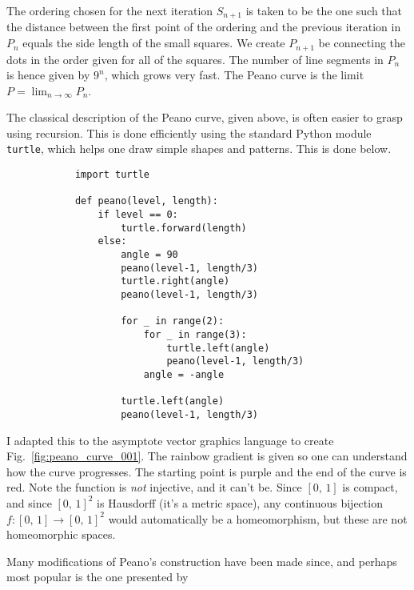 \documentclass{article}
\theoremstyle{plain}
\theoremstyle{normal}
\begin{document}
        The ordering chosen for the next iteration $S_{n+1}$ is
        taken to be the one such that the distance between the first point of
        the ordering and the previous iteration in $P_{n}$ equals the side
        length of the small squares. We create $P_{n+1}$ be connecting the
        dots in the order given for all of the squares. The number of line
        segments in $P_{n}$ is hence given by $9^{n}$, which grows very fast.
        The Peano curve is the limit $P=\lim_{n\rightarrow\infty}P_{n}$.
        \par\hfill\par
        The classical description of the Peano curve, given above, is often
        easier to grasp using recursion. This is done efficiently using the
        standard Python module \texttt{turtle}, which helps one draw simple
        shapes and patterns. This is done below.
        \begin{verbatim}
            import turtle

            def peano(level, length):
                if level == 0:
                    turtle.forward(length)
                else:
                    angle = 90
                    peano(level-1, length/3)
                    turtle.right(angle)
                    peano(level-1, length/3)

                    for _ in range(2):
                        for _ in range(3):
                            turtle.left(angle)
                            peano(level-1, length/3)
                        angle = -angle

                    turtle.left(angle)
                    peano(level-1, length/3)
        \end{verbatim}
        I adapted this to the asymptote vector graphics language to create
        Fig.~\ref{fig:peano_curve_001}. The rainbow gradient is given so one
        can understand how the curve progresses. The starting point is purple
        and the end of the curve is red. Note the function is \textit{not}
        injective, and it can't be. Since $[0,\,1]$ is compact, and
        since $[0,\,1]^{2}$ is Hausdorff (it's a metric space), any
        continuous bijection $f:[0,\,1]\rightarrow[0,\,1]^{2}$ would
        automatically be a homeomorphism, but these are not homeomorphic
        spaces.
        \par\hfill\par
        Many modifications of Peano's construction have been made since, and
        perhaps most popular is the one presented by
\end{document}
